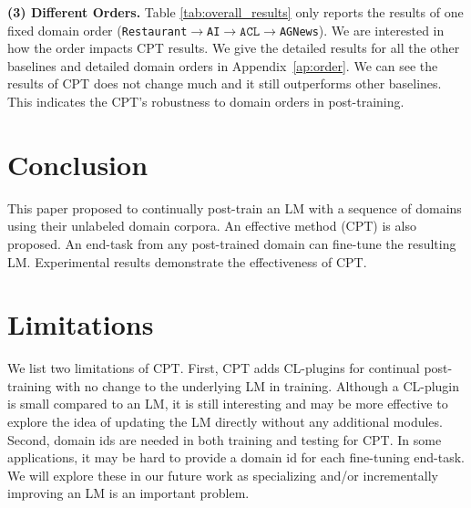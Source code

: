 \documentclass[11pt]{article}
\begin{document}
\textbf{(3) Different Orders.} Table \ref{tab:overall_results} only reports the results of one fixed domain order (\texttt{Restaurant}$\to$\texttt{AI}$\to\texttt{ACL}\to$\texttt{AGNews}). We are interested in how the order impacts CPT results. We give the detailed results for all the other baselines and detailed domain orders in Appendix~\ref{ap:order}. We can see the results of CPT does not change much and it still outperforms other baselines. This indicates the CPT's robustness to domain orders in  post-training. 

















\begin{table}[]
\centering
{}
\caption{Ablation experiment results. }
\label{tab:ablation_results}
\vspace{-6mm}
\end{table}




\section{Conclusion}
{\color{black}This paper proposed to continually post-train an LM with a sequence of domains using their unlabeled domain corpora. An effective method (CPT) is also proposed. An end-task from any post-trained domain can fine-tune the resulting LM. Experimental results demonstrate the effectiveness of CPT. } 


\section{Limitations}
{\color{black}We list two limitations of CPT. First, CPT adds CL-plugins for continual post-training with no change to the underlying LM in training. Although a CL-plugin is small compared to an LM, it is still interesting and may be more effective to explore the idea of updating the LM directly without any additional modules. Second, domain ids are needed in both training and testing for CPT. In some applications, it may be hard to provide a domain id for each fine-tuning end-task. We will explore these in our future work as specializing and/or incrementally improving an LM is an important problem.} 
\end{document}
